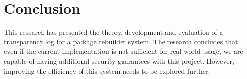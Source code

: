 \documentclass[../Main/thesis.tex]{subfiles}
\begin{document}
\section{Conclusion}%
\label{sec:conclusion_conclusion}
This research has presented the theory, development and evaluation of a
transparency log for a package rebuilder system. The research concludes that
even if the current implementation is not sufficient for real-world usage, we
are capable of having additional security guarantees with this project. However,
improving the efficiency of this system needs to be explored further.



\blankpage
\end{document}
